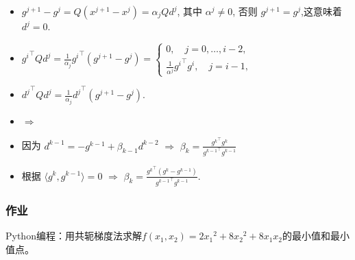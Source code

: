 \documentclass{beamer}
\begin{document}
	
	\begin{frame}
		
			\begin{itemize}
				\item $g^{j+1}-g^j=Q(x^{j+1}-x^j)=\alpha_jQd^j$, 其中 ${\alpha}^j \neq 0$, 否则 ${g}^{j+1}={g}^j$,这意味着 ${d}^j=0$.
				\item ${g^i}^{\top}Qd^j=\frac{1}{\alpha_j}{g^i}^{\top}(g^{j+1}
				-g^j)=
				\begin{cases}
					0,\quad j=0,\dots,i-2,\\
					\frac{1}{\alpha^j}{g^i}^{\top}g^i,\quad j=i-1,
				\end{cases}$
				\item ${d^j}^{\top}Qd^j=\frac{1}{\alpha_j}
				{d^j}^{\top}(g^{j+1}-g^j)$.
				\item $\Rightarrow$  
				\item 因为 $ d^{k-1}=-g^{k-1}+\beta_{k-1}d^{k-2}$
				$\Rightarrow$
				$\beta_k=\frac{ {g^k}^{\top}g^k}{{g^{k-1}}^\top g^{k-1}}$
				\item 根据   $\langle g^k, g^{k-1}\rangle =0$ $\Rightarrow$ $\beta_k=\frac{{g^k}^\top(g^k-g^{k-1})}
				{{g^{k-1}}^\top g^{k-1}}$.
			\end{itemize}
			
			
		
		
	\end{frame}
	
	\begin{frame}
          \frametitle{作业}
		\normaltitle{1.}
		Python编程：用共轭梯度法求解$f(x_1,x_2)=2{x_1}^2+8{x_2}^2+8x_1x_2$的最小值和最小值点。
		
	\end{frame}
	
	
	
	
	
	
\end{document}
